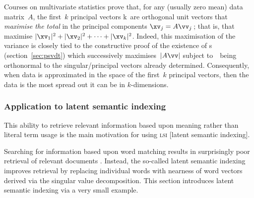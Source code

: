Courses on multivariate statistics prove that, for any (usually zero mean) data matrix~\(A\), the first~\(k\) principal vectors \hlist\vv k\ are orthogonal unit vectors that \emph{maximise the total } in the principal components \(\xv_j=A\vv_j\)\,; that is, that maximise \(|\xv_1|^2+|\xv_2|^2+\cdots+|\xv_k|^2\).
Indeed, this maximisation of the variance is closely tied to the constructive proof of the existence of \svd{}s (section~\ref{sec:psvdt}) which successively maximises~\(|A\vv|\) subject to~\vv\ being orthonormal to the singular\slash principal vectors already determined.
Consequently, when data is approximated in the space of the first~\(k\) principal vectors, then the data is the most spread out it can be in \(k\)-dimensions.







\subsubsection{Application to latent semantic indexing}
\label{sec:alsi}

\begin{quoted}{\cite[p.579]{Berry95}}
This ability to retrieve relevant information based upon meaning rather than literal term usage is the main motivation for using \textsc{lsi} [latent semantic indexing].
\end{quoted}

Searching for information based upon word matching results in surprisingly poor retrieval of relevant documents \cite[\S5.5]{Berry95}.
Instead, the so-called latent semantic indexing improves retrieval by replacing individual words with nearness of word vectors derived via the singular value decomposition.
This section introduces latent semantic indexing via a very small example. 


